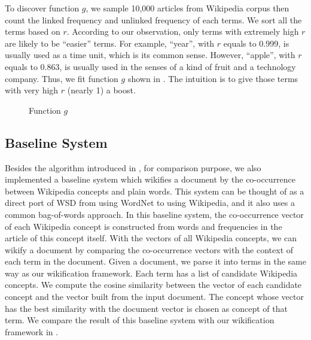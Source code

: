 {To discover function $g$, we sample 10,000 articles from Wikipedia corpus then count the
linked frequency and unlinked frequency of each terms. We sort all the terms based
on $r$. According to our observation, only terms with extremely high $r$ are likely
to be ``easier'' terms. For example, ``year'', with $r$ equals to 0.999, is
usually used as a time unit, which is its common sense. However, ``apple'',
with $r$ equals to 0.863, is usually used in the senses of a kind of fruit
and a technology company. Thus, we fit function
$g$ shown in . The intuition is to give those terms with very
high $r$ (nearly 1) a boost.

\begin{figure}[th]
\centering
{}
\caption{Function $g$}
\label{fig:gfun}
\end{figure}
}
\subsection{Baseline System}
Besides the algorithm introduced in ,
for comparison purpose,
we also implemented a baseline system which wikifies a document by the
co-occurrence between Wikipedia concepts and plain words.
This system can be thought of as a direct port of WSD from using WordNet to
using Wikipedia, and it also uses a common bag-of-words approach.
In this baseline system, the co-occurrence vector of
each Wikipedia concept is constructed
from words and frequencies in the article of this concept itself.
With the vectors of all Wikipedia concepts,
we can wikify a document by comparing the co-occurrence vectors with
the context of each term in the document. Given a document, we parse it
into terms in the same way as our wikification framework.
Each term has a list of candidate Wikipedia concepts.
We compute the cosine similarity
between the vector of each candidate concept and the vector built from
the input document. The concept whose vector has the best similarity with
the document vector is chosen as concept of that
term. We compare the result of this baseline system with
our wikification framework in .

%
